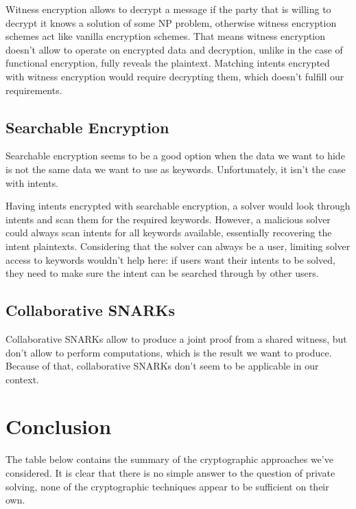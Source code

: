 \documentclass[final]{msc}
\begin{document}
Witness encryption allows to decrypt a message if the party that is willing to decrypt it knows a solution of some NP problem, otherwise witness encryption schemes act like vanilla encryption schemes. That means witness encryption doesn't allow to operate on encrypted data and decryption, unlike in the case of functional encryption, fully reveals the plaintext. Matching intents encrypted with witness encryption would require decrypting them, which doesn't fulfill our requirements.

\subsection{Searchable Encryption}

Searchable encryption seems to be a good option when the data we want to hide is not the same data we want to use as keywords. Unfortunately, it isn't the case with intents.

Having intents encrypted with searchable encryption, a solver would look through intents and scan them for the required keywords. However, a malicious solver could always scan intents for all keywords available, essentially recovering the intent plaintexts. Considering that the solver can always be a user, limiting solver access to keywords wouldn't help here: if users want their intents to be solved, they need to make sure the intent can be searched through by other users. 

\subsection{Collaborative SNARKs}

Collaborative SNARKs allow to produce a joint proof from a shared witness, but don't allow to perform computations, which is the result we want to produce. Because of that, collaborative SNARKs don't seem to be applicable in our context.

\section{Conclusion}

The table below contains the summary of the cryptographic approaches we've considered. It is clear that there is no simple answer to the question of private solving, none of the cryptographic techniques appear to be sufficient on their own.
\end{document}
